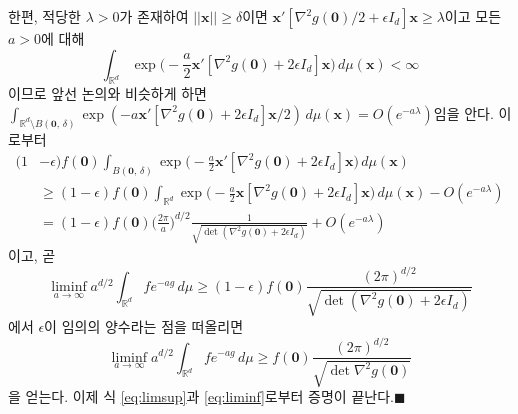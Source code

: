 \documentclass[11pt,onecolumn,twoside,a4size]{gsag3jnl}
\begin{document}
한편, 적당한 $\lambda>0$가 존재하여 $||\mathbf{x}||\geq\delta$이면 $\mathbf{x}'[\nabla^2g(\mathbf{0})/2+\epsilon I_d]\mathbf{x}\geq\lambda$이고 모든 $a>0$에 대해 
\begin{equation}
  \int_{\mathbb{R}^d}\exp\bigg(-\frac{a}{2}\mathbf{x}'[\nabla^2g(\mathbf{0})+2\epsilon I_d]\mathbf{x}\bigg)\,d\mu(\mathbf{x})<\infty
\end{equation}
이므로 앞선 논의와 비슷하게 하면 $\int_{\mathbb{R}^d\setminus B(\mathbf{0},\,\delta)}\exp(-a\mathbf{x}'[\nabla^2g(\mathbf{0})+2\epsilon I_d]\mathbf{x}/2)\,d\mu(\mathbf{x})=O(e^{-a\lambda})$임을 안다. 이로부터
\begin{align}
  (1&-\epsilon)f(\mathbf{0})\int_{B(\mathbf{0},\,\delta)}\exp\bigg(-\frac{a}{2}\mathbf{x}'[\nabla^2g(\mathbf{0})+2\epsilon I_d]\mathbf{x}\bigg)\,d\mu(\mathbf{x})\\
  &\geq(1-\epsilon)f(\mathbf{0})\int_{\mathbb{R}^d}\exp\bigg(-\frac{a}{2}\mathbf{x}[\nabla^2g(\mathbf{0})+2\epsilon I_d]\mathbf{x}\bigg)\,d\mu(\mathbf{x})-O(e^{-a\lambda})\nonumber\\
  &=(1-\epsilon)f(\mathbf{0})\bigg(\frac{2\pi}{a}\bigg)^{d/2}\frac{1}{\sqrt{\det(\nabla^2 g(\mathbf{0})+2\epsilon I_d)}}+O(e^{-a\lambda})\nonumber
\end{align}
이고, 곧 
\begin{equation}
  \liminf_{a\to\infty}a^{d/2}\int_{\mathbb{R}^d}fe^{-ag}\,d\mu\geq(1-\epsilon)f(\mathbf{0})\frac{(2\pi)^{d/2}}{\sqrt{\det(\nabla^2 g(\mathbf{0})+2\epsilon I_d)}}
\end{equation}
에서 $\epsilon$이 임의의 양수라는 점을 떠올리면
\begin{equation}\label{eq:liminf}
  \liminf_{a\to\infty}a^{d/2}\int_{\mathbb{R}^d}fe^{-ag}\,d\mu\geq f(\mathbf{0})\frac{(2\pi)^{d/2}}{\sqrt{\det\nabla^2 g(\mathbf{0})}}
\end{equation}
을 얻는다. 이제 식 \ref{eq:limsup}과 \ref{eq:liminf}로부터 증명이 끝난다.\hfill$\blacksquare$\\
\end{document}
